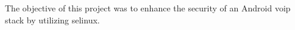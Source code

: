 The objective of this project was to enhance the security of an Android \ac{voip} stack by utilizing \ac{selinux}.
